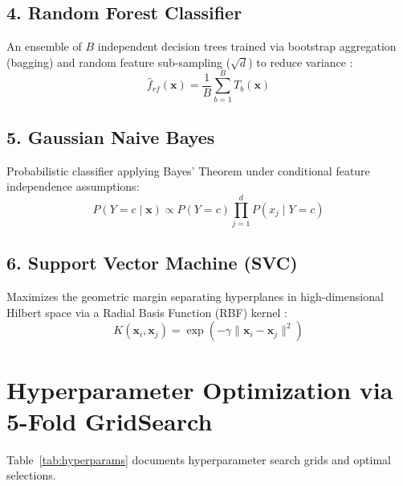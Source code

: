 \subsection{4. Random Forest Classifier}
An ensemble of $B$ independent decision trees trained via bootstrap aggregation (bagging) and random feature sub-sampling ($\sqrt{d}$) to reduce variance \cite{breiman2001random}:
\begin{equation}
\hat{f}_{rf}(\mathbf{x}) = \frac{1}{B} \sum_{b=1}^B T_b(\mathbf{x})
\end{equation}

\subsection{5. Gaussian Naive Bayes}
Probabilistic classifier applying Bayes' Theorem under conditional feature independence assumptions:
\begin{equation}
P(Y = c \mid \mathbf{x}) \propto P(Y = c) \prod_{j=1}^d P(x_j \mid Y = c)
\end{equation}

\subsection{6. Support Vector Machine (SVC)}
Maximizes the geometric margin separating hyperplanes in high-dimensional Hilbert space via a Radial Basis Function (RBF) kernel \cite{cortes1995support}:
\begin{equation}
K(\mathbf{x}_i, \mathbf{x}_j) = \exp\left(-\gamma \|\mathbf{x}_i - \mathbf{x}_j\|^2\right)
\end{equation}

\section{Hyperparameter Optimization via 5-Fold GridSearch}
Table~\ref{tab:hyperparams} documents hyperparameter search grids and optimal selections.

